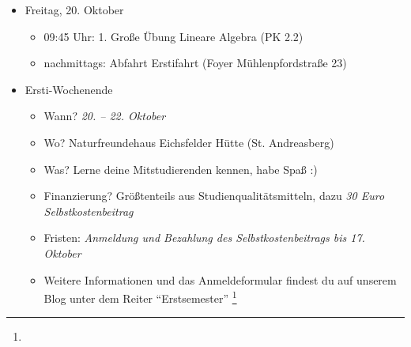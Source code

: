 \begin{itemize}
	\item Freitag, 20. Oktober
	\begin{itemize}
		\item 09:45 Uhr: 1. Große Übung Lineare Algebra (PK 2.2)
        \item nachmittags: Abfahrt Erstifahrt (Foyer Mühlenpfordstraße 23)
	\end{itemize}
	\item Ersti-Wochenende
	\begin{itemize}
		\item Wann? \emph{20. – 22. Oktober}
		\item Wo? Naturfreundehaus Eichsfelder Hütte (St. Andreasberg)
		\item Was? Lerne deine Mitstudierenden kennen, habe Spaß :)
		\item Finanzierung? Größtenteils aus Studienqualitätsmitteln, dazu \emph{30 Euro Selbstkostenbeitrag}
		\item Fristen: \emph{Anmeldung und Bezahlung des Selbstkostenbeitrags bis 17. Oktober}
		\item Weitere Informationen und das Anmeldeformular findest du auf unserem Blog unter dem Reiter \enquote{Erstsemester} \footnote{}
	\end{itemize}
\end{itemize}
